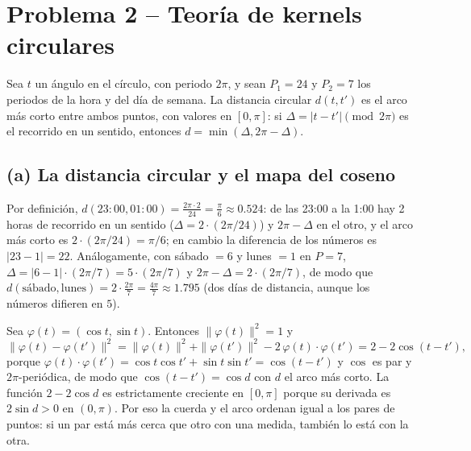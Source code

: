 \section*{Problema 2 -- Teoría de kernels circulares}

Sea $t$ un ángulo en el círculo, con periodo $2\pi$, y sean $P_1=24$ y
$P_2=7$ los periodos de la hora y del día de semana. La distancia circular
$d(t,t')$ es el arco más corto entre ambos puntos, con valores en $[0,\pi]$:
si $\Delta=|t-t'|\pmod{2\pi}$ es el recorrido en un sentido, entonces
$d=\min(\Delta,2\pi-\Delta)$.

\subsection*{(a) La distancia circular y el mapa del coseno}

Por definición, $d(23{:}00,01{:}00)=\frac{2\pi\cdot 2}{24}=\frac{\pi}{6}\approx 0.524$:
de las 23:00 a la 1:00 hay 2 horas de recorrido en un sentido
($\Delta=2\cdot(2\pi/24)$) y $2\pi-\Delta$ en el otro, y el arco más corto es
$2\cdot(2\pi/24)=\pi/6$; en cambio la diferencia de los números es $|23-1|=22$.
Análogamente, con sábado $=6$ y lunes $=1$ en $P=7$,
$\Delta=|6-1|\cdot(2\pi/7)=5\cdot(2\pi/7)$ y $2\pi-\Delta=2\cdot(2\pi/7)$, de
modo que $d(\text{sábado},\text{lunes})=2\cdot\frac{2\pi}{7}=\frac{4\pi}{7}\approx 1.795$
(dos días de distancia, aunque los números difieren en $5$).

Sea $\varphi(t)=(\cos t,\sin t)$. Entonces $\|\varphi(t)\|^2=1$ y
\[
\|\varphi(t)-\varphi(t')\|^2
=\|\varphi(t)\|^2+\|\varphi(t')\|^2-2\,\varphi(t)\cdot\varphi(t')
=2-2\cos(t-t'),
\]
porque $\varphi(t)\cdot\varphi(t')=\cos t\cos t'+\sin t\sin t'=\cos(t-t')$
y $\cos$ es par y $2\pi$-periódica, de modo que $\cos(t-t')=\cos d$ con $d$
el arco más corto. La función $2-2\cos d$ es estrictamente creciente en
$[0,\pi]$ porque su derivada es $2\sin d>0$ en $(0,\pi)$. Por eso la cuerda y
el arco ordenan igual a los pares de puntos: si un par está más cerca que otro
con una medida, también lo está con la otra.

\begin{center}
\end{center}

